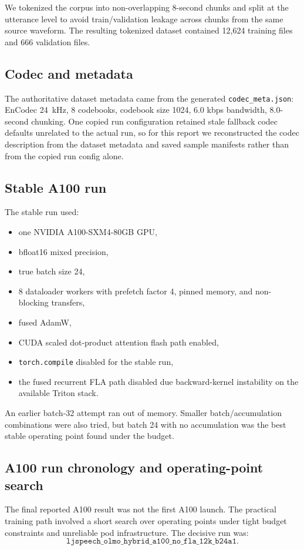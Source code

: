 \documentclass[11pt]{article}
\begin{document}
We tokenized the corpus into non-overlapping 8-second chunks and split at the utterance level to avoid train/validation leakage across chunks from the same source waveform. The resulting tokenized dataset contained 12,624 training files and 666 validation files.

\subsection{Codec and metadata}
The authoritative dataset metadata came from the generated \texttt{codec\_meta.json}: EnCodec 24~kHz, 8 codebooks, codebook size 1024, 6.0 kbps bandwidth, 8.0-second chunking. One copied run configuration retained stale fallback codec defaults unrelated to the actual run, so for this report we reconstructed the codec description from the dataset metadata and saved sample manifests rather than from the copied run config alone.

\subsection{Stable A100 run}
The stable run used:
\begin{itemize}
    \item one NVIDIA A100-SXM4-80GB GPU,
    \item bfloat16 mixed precision,
    \item true batch size 24,
    \item 8 dataloader workers with prefetch factor 4, pinned memory, and non-blocking transfers,
    \item fused AdamW,
    \item CUDA scaled dot-product attention flash path enabled,
    \item \texttt{torch.compile} disabled for the stable run,
    \item the fused recurrent FLA path disabled due backward-kernel instability on the available Triton stack.
\end{itemize}

An earlier batch-32 attempt ran out of memory. Smaller batch/accumulation combinations were also tried, but batch 24 with no accumulation was the best stable operating point found under the budget.

\subsection{A100 run chronology and operating-point search}
The final reported A100 result was not the first A100 launch. The practical training path involved a short search over operating points under tight budget constraints and unreliable pod infrastructure. The decisive run was:
\[
\texttt{ljspeech\_olmo\_hybrid\_a100\_no\_fla\_12k\_b24a1}.
\]
\end{document}
